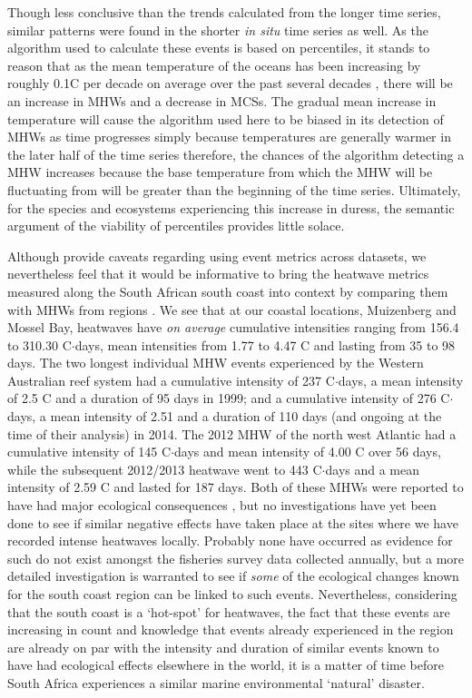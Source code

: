 \documentclass[a4paper,10pt,review]{elsarticle}
\begin{document}
Though less conclusive than the trends calculated from the longer time series, similar patterns were found in the shorter \emph{in situ} time series as well. As the algorithm used to calculate these events is based on percentiles, it stands to reason that as the mean temperature of the oceans has been increasing by roughly 0.1\degree C per decade on average over the past several decades \citep{IPCC2014}, there will be an increase in MHWs and a decrease in MCSs. The gradual mean increase in temperature will cause the algorithm used here to be biased in its detection of MHWs as time progresses simply because temperatures are generally warmer in the later half of the time series therefore, the chances of the algorithm detecting a MHW increases because the base temperature from which the MHW will be fluctuating from will be greater than the beginning of the time series. Ultimately, for the species and ecosystems experiencing this increase in duress, the semantic argument of the viability of percentiles provides little solace.

Although \citet{Hobday2016} provide caveats regarding using event metrics across datasets, we nevertheless feel that it would be informative to bring the heatwave metrics measured along the South African south coast into context by comparing them with MHWs from regions \citep[see][]{Hobday2016}. We see that at our coastal locations, Muizenberg and Mossel Bay, heatwaves have \emph{on average} cumulative intensities ranging from 156.4 to 310.30 \degree C$\cdot$days, mean intensities from 1.77 to 4.47 \degree C and lasting from 35 to 98 days. The two longest individual MHW events experienced by the Western Australian reef system \citep{Feng2013} had a cumulative intensity of 237 \degree C$\cdot$days, a mean intensity of 2.5 \degree C and a duration of 95 days in 1999; and a cumulative intensity of 276 \degree C$\cdot$days, a mean intensity of 2.51 and a duration of 110 days (and ongoing at the time of their analysis) in 2014. The 2012 MHW of the north west Atlantic \citep{Mills2012, Chen2014} had a cumulative intensity of 145 \degree C$\cdot$days and mean intensity of 4.00 \degree C over 56 days, while the subsequent 2012/2013 heatwave went to 443 \degree C$\cdot$days and a mean intensity of 2.59 \degree C and lasted for 187 days. Both of these MHWs were reported to have had major ecological consequences \citep{Feng2013, Mills2012, Chen2014}, but no investigations have yet been done to see if similar negative effects have taken place at the sites where we have recorded intense heatwaves locally. Probably none have occurred as evidence for such do not exist amongst the fisheries survey data collected annually, but a more detailed investigation is warranted to see if \emph{some} of the ecological changes known for the south coast region \citep{Bolton2012} can be linked to such events. Nevertheless, considering that the south coast is a `hot-spot' for heatwaves, the fact that these events are increasing in count and knowledge that events already experienced in the region are already on par with the intensity and duration of similar events known to have had ecological effects elsewhere in the world, it is a matter of time before South Africa experiences a similar marine environmental `natural' disaster.
\end{document}
